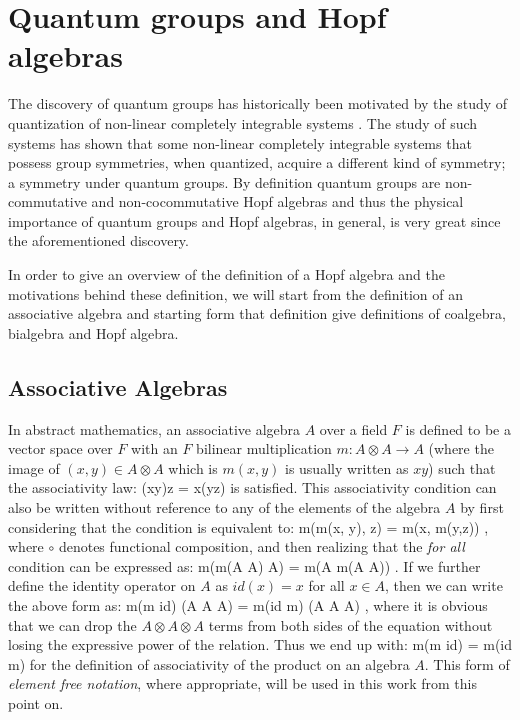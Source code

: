 \section{Quantum groups and Hopf algebras}


The discovery of quantum groups has historically been motivated by the study
of quantization of non-linear completely integrable systems \cite{sklyanin}. The study of
such systems has shown that some non-linear completely integrable systems that
possess group symmetries, when quantized, acquire a different kind of symmetry;
a symmetry under quantum groups. By definition quantum groups are non-commutative and
non-cocommutative Hopf algebras and thus the physical importance of quantum groups and
Hopf algebras, in general, is very great since the aforementioned discovery.


In order to give an overview of the definition of a Hopf algebra and the motivations
behind these definition, we will start from the definition of an associative algebra
and starting form that definition give definitions of coalgebra, bialgebra and Hopf
algebra.


\subsection{Associative Algebras}
In abstract mathematics, an associative algebra $A$ over a field $F$ is
defined to be a vector space over
$F$ with an $F$ bilinear multiplication $m: A \otimes A \rightarrow A$ (where the image of
$(x, y) \in A \otimes A$ which is $m(x,y)$ is usually written as $xy$) such that the associativity
law:
\beq
(xy)z = x(yz) \quad {}
\eeq
is satisfied. This associativity condition can also be written without reference to any of
the elements of the algebra $A$ by first considering that the condition is equivalent to:
\beq
m\circ(m(x, y), z) = m\circ(x, m(y,z)) \quad {},
\eeq
where $\circ$ denotes functional composition,
and then realizing that the {\it for all} condition can be expressed as:
\beq
m\circ(m(A \otimes A) \otimes A) = m\circ(A \otimes m(A \otimes A)) \quad .
\eeq
If we further define the identity operator on $A$ as $id(x) = x$
for all $x \in A$, then we can write the above form as:
\beq
m\circ(m \otimes id) (A \otimes A \otimes A) = m\circ(id \otimes m) (A \otimes A \otimes A) \quad ,
\eeq
where it is obvious that we can drop the $A \otimes A \otimes A$ terms from both sides
of the equation without losing the expressive power of the relation. Thus we end up with:
\beq
m\circ(m \otimes id) = m\circ(id \otimes m)
\eeq
for the definition of associativity of the product on an algebra $A$. This form of {\it element free
notation}, where appropriate, will be used in this work from this point on.


